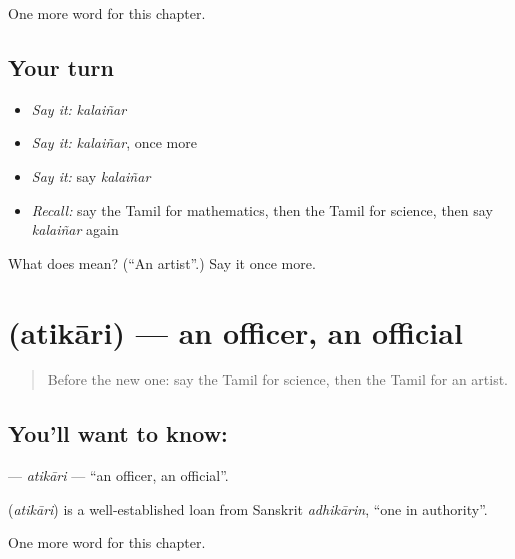 \begin{grammarlens}[title={What you've built}]
One more word for this chapter.
\end{grammarlens}

\subsection*{Your turn}
\begin{itemize}
\raggedright
  \item \emph{Say it:} \emph{kalaiñar}
  \item \emph{Say it:} \emph{kalaiñar}, once more
  \item \emph{Say it:} say \emph{kalaiñar}
  \item \emph{Recall:} say the Tamil for mathematics, then the Tamil for science, then say \emph{kalaiñar} again
\end{itemize}

\begin{tcolorbox}[breakable,colback=teal!4,colframe=teal!35!black,title={Before you move on}]
What does  mean? (\textquotedblleft{}An artist\textquotedblright{}.) Say it once more.
\end{tcolorbox}
\section[\texorpdfstring{\ta{அதிகாரி} (atikāri)}{அதிகாரி (atikāri)}]{ (atikāri) — an officer, an official}

\label{lesson:TA-C253-atikari}



\begin{quote}
Before the new one: say the Tamil for science, then the Tamil for an artist.
\end{quote}

\subsection*{You'll want to know: }
\textbf{} — \emph{atikāri} — \textquotedblleft{}an officer, an official\textquotedblright{}.

\begin{cousinweb}
\textbf{} (\emph{atikāri}) is a well-established loan from Sanskrit \emph{adhikārin}, \textquotedblleft{}one in authority\textquotedblright{}.
\end{cousinweb}

\begin{grammarlens}[title={What you've built}]
One more word for this chapter.
\end{grammarlens}

